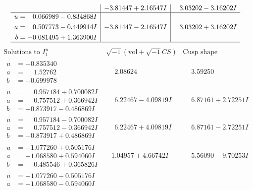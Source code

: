 \documentclass[1p]{elsarticle_modified}
\theoremstyle{definition}
\newcommand{\I}{\sqrt{-1}}
\begin{document}
$$\begin{array}{c|c|c}
 & -3.81447 + 2.16547 I & \phantom{-}3.03202 - 3.16202 I \\ \hline\begin{aligned}
u &= \phantom{-}0.066989 - 0.834868 I \\
a &= \phantom{-}0.507773 - 0.449914 I \\
b &= -0.081495 + 1.363900 I\end{aligned}
 & -3.81447 - 2.16547 I & \phantom{-}3.03202 + 3.16202 I\\
 \hline 
 \end{array}$$\newpage$$\begin{array}{c|c|c}  
\text{Solutions to }I^u_{1}& \I (\text{vol} + \sqrt{-1}CS) & \text{Cusp shape}\\
 \hline 
\begin{aligned}
u &= -0.835340\phantom{ +0.000000I} \\
a &= \phantom{-}1.52762\phantom{ +0.000000I} \\
b &= -0.699978\phantom{ +0.000000I}\end{aligned}
 & \phantom{-}2.08624\phantom{ +0.000000I} & \phantom{-}3.59250\phantom{ +0.000000I} \\ \hline\begin{aligned}
u &= \phantom{-}0.957184 + 0.700082 I \\
a &= \phantom{-}0.757512 + 0.366942 I \\
b &= -0.873917 - 0.486869 I\end{aligned}
 & \phantom{-}6.22467 - 4.09819 I & \phantom{-}6.87161 + 2.72251 I \\ \hline\begin{aligned}
u &= \phantom{-}0.957184 - 0.700082 I \\
a &= \phantom{-}0.757512 - 0.366942 I \\
b &= -0.873917 + 0.486869 I\end{aligned}
 & \phantom{-}6.22467 + 4.09819 I & \phantom{-}6.87161 - 2.72251 I \\ \hline\begin{aligned}
u &= -1.077260 + 0.505176 I \\
a &= -1.068580 + 0.594060 I \\
b &= \phantom{-}0.485546 + 0.365826 I\end{aligned}
 & -1.04957 + 4.66742 I & \phantom{-}5.56090 - 9.70253 I \\ \hline\begin{aligned}
u &= -1.077260 - 0.505176 I \\
a &= -1.068580 - 0.594060 I \\

\end{aligned}
\end{array}$$
\end{document}
